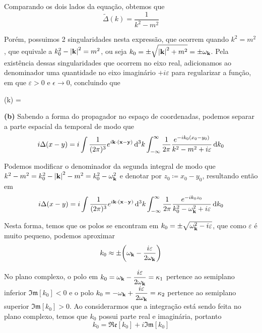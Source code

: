 Comparando os dois lados da equação, obtemos que
    \begin{equation*}
        \tilde{\Delta}(k) = \dfrac{1}{k^2 - m^2}
    \end{equation*}

Porém, possuimos 2 singularidades nesta expressão, que ocorrem quando $k^2 = m^2$, que equivale a $k_{0}^2 - \abs{\vb{k}}^2 = m^2$, ou seja $k_{0} = \pm \sqrt{\abs{\vb{k}}^2 + m^2} = \pm\omega_{\vb{k}}$. Pela existência dessas singularidades que ocorrem no eixo real, adicionamos ao denominador uma quantidade no eixo imaginário $+i\varepsilon$ para regularizar a função, em que $\varepsilon>0$ e $\epsilon\to0$, concluindo que
    \begin{answer}\label{eq: propagator in momentum space}
        \tilde{\Delta}(k) = 
    \end{answer}

\noindent \textbf{(b)} Sabendo a forma do propagador no espaço de coordenadas, podemos separar a parte espacial da temporal de modo que
    \begin{equation*}
        i\Delta(x-y) = i\int \dfrac{1}{(2\pi)^3}e^{i\vb{k}\cdot(\vb{x}-\vb{y})}\dd[3]{k} \int_{-\infty}^{\infty} \dfrac{1}{2\pi} \dfrac{e^{-ik_{0}(x_{0}-y_{0})}}{k^2 - m^2 + i\varepsilon}\dd{k_{0}}
    \end{equation*}

Podemos modificar o denominador da segunda integral de modo que $k^2 - m^2 = k_{0}^2 - \abs{\vb{k}}^2 - m^2 = k_{0}^2 - \omega_{\vb{k}}^2$ e denotar por $z_{0} \coloneqq x_{0}-y_{0}$, resultando então em
    \begin{equation*}
        i\Delta(x-y) = i\int \dfrac{1}{(2\pi)^3}e^{i\vb{k}\cdot(\vb{x}-\vb{y})}\dd[3]{k} \int_{-\infty}^{\infty} \dfrac{1}{2\pi} \dfrac{e^{-ik_{0}z_{0}}}{k_{0}^2 - \omega_{\vb{k}}^2 + i\varepsilon}  \dd{k_{0}}
    \end{equation*}

Nesta forma, temos que os polos se encontram em $k_{0} = \pm \sqrt{\omega_{\vb{k}}^2 - i\varepsilon}$, que como $\varepsilon$ é muito pequeno, podemos aproximar
    \begin{equation*}
        k_{0} \approx \pm\qty(\omega_{\vb{k}} - \dfrac{i\varepsilon}{2\omega_{\vb{k}}})
    \end{equation*}

No plano complexo, o polo em $k_{0} = \omega_{\vb{k}} - \dfrac{i\varepsilon}{2\omega_{\vb{k}}} = \kappa_{1}$ pertence ao semiplano inferior $\mathfrak{Im}[k_{0}] < 0$ e o polo $k_{0} = -\omega_{\vb{k}} + \dfrac{i\varepsilon}{2\omega_{\vb{k}}} = \kappa_{2}$ pertence ao semiplano superior $\mathfrak{Im}[k_{0}] > 0$. Ao considerarmos que a integração está sendo feita no plano complexo, temos que $k_{0}$ possui parte real e imaginária, portanto
    \begin{equation*}
        k_{0} = \mathfrak{Re}[k_{0}] + i\mathfrak{Im}[k_{0}]
    \end{equation*}

